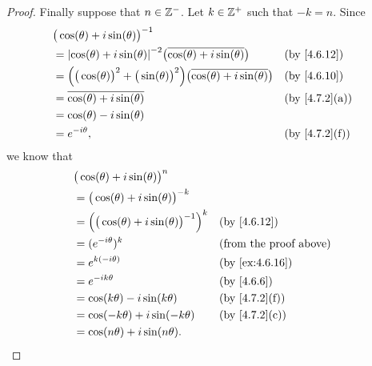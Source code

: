\begin{proof}
  Finally suppose that \(n \in \mathbb{Z}^-\).
  Let \(k \in \mathbb{Z}^+\) such that \(-k = n\).
  Since
  \begin{align*}
     & \big(\cos(\theta) + i \sin(\theta)\big)^{-1}                                                                                                        \\
     & = \abs{\cos(\theta) + i \sin(\theta)}^{-2} \big(\overline{\cos(\theta) + i \sin(\theta)}\big)                      &  & \by{4.6.12}                 \\
     & = \Big(\big(\cos(\theta)\big)^2 + \big(\sin(\theta)\big)^2\Big) \big(\overline{\cos(\theta) + i \sin(\theta)}\big) &  & \by{4.6.10}                 \\
     & = \overline{\cos(\theta) + i \sin(\theta)}                                                                         &  & \text{(by \cref{4.7.2}(a))} \\
     & = \cos(\theta) - i \sin(\theta)                                                                                                                     \\
     & = e^{- i \theta},                                                                                                  &  & \text{(by \cref{4.7.2}(f))}
  \end{align*}
  we know that
  \begin{align*}
     & \big(\cos(\theta) + i \sin(\theta)\big)^n                                                     \\
     & = \big(\cos(\theta) + i \sin(\theta)\big)^{-k}                                                \\
     & = \Big(\big(\cos(\theta) + i \sin(\theta)\big)^{-1}\Big)^k &  & \by{4.6.12}                   \\
     & = (e^{- i \theta})^k                                       &  & \text{(from the proof above)} \\
     & = e^{k (- i \theta)}                                       &  & \by{ex:4.6.16}                \\
     & = e^{- i k \theta}                                         &  & \by{4.6.6}                    \\
     & = \cos(k \theta) - i \sin(k \theta)                        &  & \text{(by \cref{4.7.2}(f))}   \\
     & = \cos(- k \theta) + i \sin(- k \theta)                    &  & \text{(by \cref{4.7.2}(c))}   \\
     & = \cos(n \theta) + i \sin(n \theta).

\end{align*}
\end{proof}
